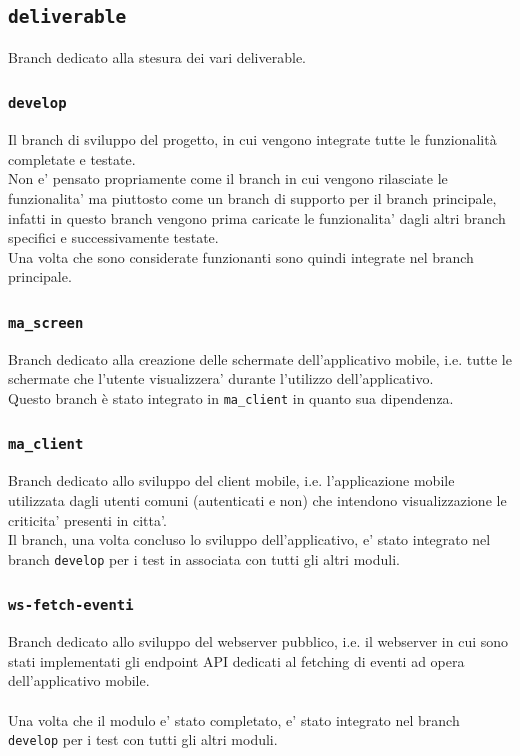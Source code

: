 \documentclass{article}
\begin{document}
\subsection{\texttt{deliverable}}
Branch dedicato alla stesura dei vari deliverable.

\subsubsection{\texttt{develop}}
Il branch di sviluppo del progetto, in cui vengono integrate tutte le funzionalità completate e testate.\\
Non e' pensato propriamente come il branch in cui vengono rilasciate le funzionalita' ma piuttosto come un branch di supporto per il branch principale, infatti in questo branch vengono prima caricate le funzionalita' dagli altri branch specifici e successivamente testate.\\
Una volta che sono considerate funzionanti sono quindi integrate nel branch principale.

\subsubsection{\texttt{ma\_screen}}
Branch dedicato alla creazione delle schermate dell'applicativo mobile, i.e. tutte le schermate che l'utente visualizzera' durante l'utilizzo dell'applicativo.\\
Questo branch è stato integrato in \texttt{ma\_client} in quanto sua dipendenza.

\subsubsection{\texttt{ma\_client}}
Branch dedicato allo sviluppo del client mobile, i.e. l'applicazione mobile utilizzata dagli utenti comuni (autenticati e non) che intendono visualizzazione le criticita' presenti in citta'.\\
Il branch, una volta concluso lo sviluppo dell'applicativo, e' stato integrato nel branch \texttt{develop} per i test in associata con tutti gli altri moduli.

\subsubsection{\texttt{ws-fetch-eventi}}
Branch dedicato allo sviluppo del webserver pubblico, i.e. il webserver in cui sono stati implementati gli endpoint API dedicati al fetching di eventi ad opera dell'applicativo mobile.\\
\\
Una volta che il modulo e' stato completato, e' stato integrato nel branch \texttt{develop} per i test con tutti gli altri moduli.
\end{document}

